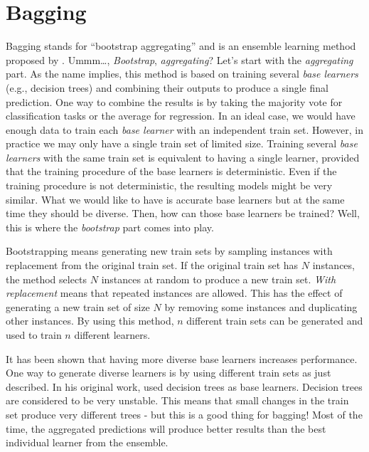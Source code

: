 \documentclass[
  11pt,
]{krantz}
\begin{document}
\hypertarget{bagging}{%
\section{Bagging}\label{bagging}}

Bagging stands for ``bootstrap aggregating'' and is an ensemble learning method proposed by \citet{breimanBagging1996}. Ummm\ldots, \emph{Bootstrap}, \emph{aggregating}? Let's start with the \emph{aggregating} part. As the name implies, this method is based on training several \emph{base learners} (e.g., decision trees) and combining their outputs to produce a single final prediction. One way to combine the results is by taking the majority vote for classification tasks or the average for regression. In an ideal case, we would have enough data to train each \emph{base learner} with an independent train set. However, in practice we may only have a single train set of limited size. Training several \emph{base learners} with the same train set is equivalent to having a single learner, provided that the training procedure of the base learners is deterministic. Even if the training procedure is not deterministic, the resulting models might be very similar. What we would like to have is accurate base learners but at the same time they should be diverse. Then, how can those base learners be trained? Well, this is where the \emph{bootstrap} part comes into play.

Bootstrapping means generating new train sets by sampling instances with replacement from the original train set. If the original train set has \(N\) instances, the method selects \(N\) instances at random to produce a new train set. \emph{With replacement} means that repeated instances are allowed. This has the effect of generating a new train set of size \(N\) by removing some instances and duplicating other instances. By using this method, \(n\) different train sets can be generated and used to train \(n\) different learners.

It has been shown that having more diverse base learners increases performance. One way to generate diverse learners is by using different train sets as just described. In his original work, \citet{breimanBagging1996} used decision trees as base learners. Decision trees are considered to be very unstable. This means that small changes in the train set produce very different trees - but this is a good thing for bagging! Most of the time, the aggregated predictions will produce better results than the best individual learner from the ensemble.
\end{document}
